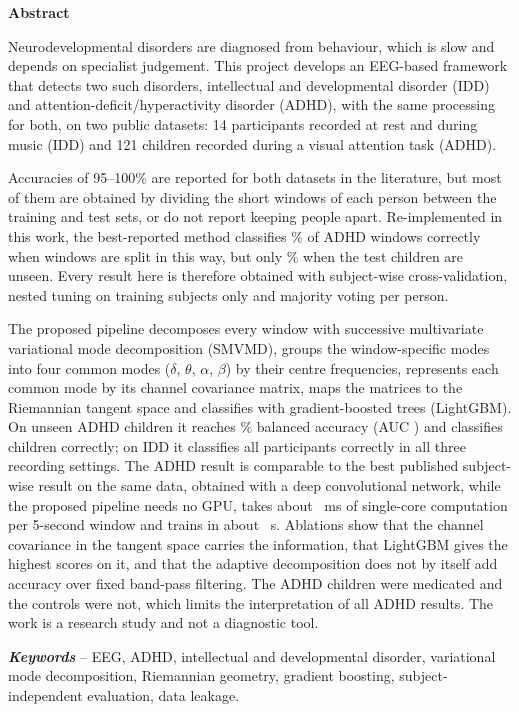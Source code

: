 \newpage
\begin{center}{\Large\bf Abstract}\end{center}
Neurodevelopmental disorders are diagnosed from behaviour, which is slow and depends on
specialist judgement. This project develops an EEG-based framework that detects two such
disorders, intellectual and developmental disorder (IDD) and attention-deficit/hyperactivity
disorder (ADHD), with the same processing for both, on two public datasets: 14 participants
recorded at rest and during music (IDD) and 121 children recorded during a visual attention task
(ADHD).

Accuracies of 95--100\% are reported for both datasets in the literature, but most of them are
obtained by dividing the short windows of each person between the training and test sets, or do
not report keeping people apart. Re-implemented in this work, the best-reported method classifies
\% of ADHD windows correctly when windows are split in this way, but only
\% when the test children are unseen. Every result here is therefore obtained
with subject-wise cross-validation, nested tuning on training subjects only and majority voting
per person.

The proposed pipeline decomposes every window with successive multivariate variational mode
decomposition (SMVMD), groups the window-specific modes into four common modes ($\delta$,
$\theta$, $\alpha$, $\beta$) by their centre frequencies, represents each common mode by its
channel covariance matrix, maps the matrices to the Riemannian tangent space and classifies with
gradient-boosted trees (LightGBM). On unseen ADHD children it reaches \%
balanced accuracy (AUC ) and classifies
 children correctly; on IDD it classifies all participants correctly in all three
recording settings. The ADHD result is comparable to the best published subject-wise result on the same
data, obtained with a deep convolutional network, while the proposed pipeline needs no GPU, takes
about ~ms of single-core computation per 5-second window and trains in about
~s. Ablations show that the channel covariance in the tangent space carries the
information, that LightGBM gives the highest scores on it, and that the adaptive decomposition
does not by itself add accuracy over fixed band-pass filtering. The ADHD
children were medicated and the controls were not, which limits the interpretation of all ADHD
results. The work is a research study and not a diagnostic tool.

\vspace{2mm}
\noindent\textbf{\emph{Keywords}} -- EEG, ADHD, intellectual and developmental disorder,
variational mode decomposition, Riemannian geometry, gradient boosting, subject-independent
evaluation, data leakage.
